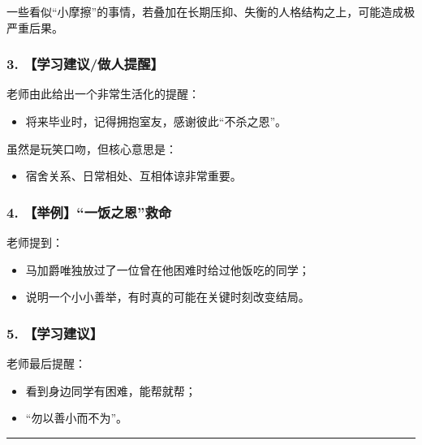 \documentclass[
  chinese,
  9pt,
  a4paper,
]{ctexart}
\providecommand{\tightlist}{%
  \setlength{\itemsep}{0pt}\setlength{\parskip}{0pt}}
\begin{document}
一些看似``小摩擦''的事情，若叠加在长期压抑、失衡的人格结构之上，可能造成极严重后果。

\subsubsection{3.
【学习建议/做人提醒】}\label{ux5b66ux4e60ux5efaux8baeux505aux4ebaux63d0ux9192}

老师由此给出一个非常生活化的提醒：

\begin{itemize}
\tightlist
\item
  将来毕业时，记得拥抱室友，感谢彼此``不杀之恩''。
\end{itemize}

虽然是玩笑口吻，但核心意思是：

\begin{itemize}
\tightlist
\item
  宿舍关系、日常相处、互相体谅非常重要。
\end{itemize}

\subsubsection{4.
【举例】``一饭之恩''救命}\label{ux4e3eux4f8bux4e00ux996dux4e4bux6069ux6551ux547d}

老师提到：

\begin{itemize}
\tightlist
\item
  马加爵唯独放过了一位曾在他困难时给过他饭吃的同学；
\item
  说明一个小小善举，有时真的可能在关键时刻改变结局。
\end{itemize}

\subsubsection{5. 【学习建议】}\label{ux5b66ux4e60ux5efaux8bae-2}

老师最后提醒：

\begin{itemize}
\tightlist
\item
  看到身边同学有困难，能帮就帮；
\item
  ``勿以善小而不为''。
\end{itemize}

\begin{center}\rule{0.5\linewidth}{0.5pt}\end{center}
\end{document}
